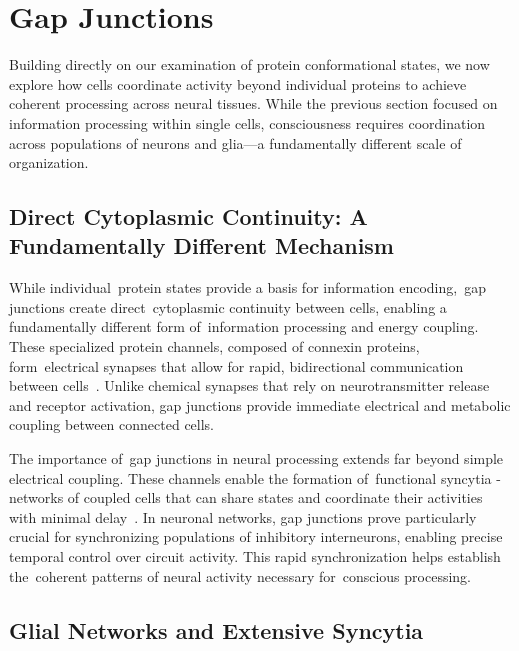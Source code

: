 \section{Gap Junctions~~~}

Building directly on our examination of protein conformational states, we now explore how cells coordinate activity beyond individual proteins to achieve coherent processing across neural tissues. While the previous section focused on information processing within single cells, consciousness requires coordination across populations of neurons and glia—a fundamentally different scale of organization.

\subsection*{Direct Cytoplasmic Continuity: A Fundamentally Different Mechanism~}

While individual~protein states provide a basis for information encoding,~gap junctions create direct~cytoplasmic continuity between cells, enabling a fundamentally different form of~information processing and energy coupling. These specialized protein channels, composed of connexin proteins, form~electrical synapses that allow for rapid, bidirectional communication between cells~\cite{Giaume1996, Nagy2018}. Unlike chemical synapses that rely on neurotransmitter release and receptor activation, gap junctions provide immediate electrical and metabolic coupling between connected cells.

The importance of~gap junctions in neural processing extends far beyond simple electrical coupling. These channels enable the formation of~functional syncytia - networks of coupled cells that can share states and coordinate their activities with minimal delay~\cite{Bennett2004, Verkhratsky2018}. In neuronal networks, gap junctions prove particularly crucial for synchronizing populations of inhibitory interneurons, enabling precise temporal control over circuit activity. This rapid synchronization helps establish the~coherent patterns of neural activity necessary for~conscious processing.

\subsection*{Glial Networks and Extensive Syncytia~~}

